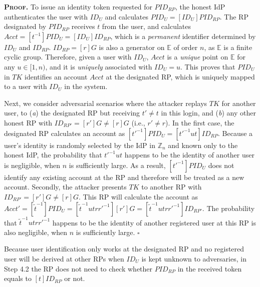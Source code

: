 \noindent\textbf{\textsc{Proof.}}
To issue an identity token requested for $PID_{RP}$, the honest IdP authenticates the user with $ID_U$ and calculates $PID_U = [ID_U]PID_{RP}$.
The RP designated by $PID_{RP}$ receives $t$ from the user,
    and calculates $Acct = [t^{-1}]PID_{U} = [ID_U]ID_{RP}$, which is a \emph{permanent} identifier determined by $ID_U$ and $ID_{RP}$.
$ID_{RP} = [r]G$ is also a generator on $\mathbb{E}$ of order $n$, as $\mathbb{E}$ is a finite cyclic group. Therefore, given a user with $ID_U$, $Acct$ is a \emph{unique} point on $\mathbb{E}$ for any $u \in [1, n)$, and it is \emph{uniquely} associated with $ID_U=u$. 
This proves that $PID_U$ in $TK$ identifies an account $Acct$ at the designated RP, which is uniquely mapped to a user with $ID_U$ in the system.

Next, we consider adversarial scenarios where the attacker replays $TK$ for another user,
 to (\emph{a}) the designated RP but receiving $t'\neq t$ in this login, and (\emph{b}) any other honest RP with $ID_{RP'} = [r']G \neq [r]G$ (i.e., $r' \neq r$). In the first case, the designated RP calculates an account as $[t'^{-1}]PID_U = [t'^{-1}ut]ID_{RP}$.
Because a user's identity is randomly selected by the IdP in $\mathbb{Z}_n$ and known only to the honest IdP, the probability that $t'^{-1}ut$ happens to be the identity of another user is negligible, when $n$ is sufficiently large. As a result, $[t'^{-1}]PID_U$ does not identify any existing account at the RP and therefore will be treated as a new account. 
Secondly, the attacker presents $TK$ to another RP with $ID_{RP'} = [r']G \neq [r]G$.
This RP will calculate the account as $Acct' = [\tilde{t}^{-1}]PID_{U} = [\tilde{t}^{-1}utrr'^{-1}][r']G = [\tilde{t}^{-1}utrr'^{-1}]ID_{RP'}$. The probability that $\tilde{t}^{-1}utrr'^{-1}$ happens to be the identity of another registered user at this RP is also negligible, when $n$ is sufficiently large. 
\hfill $\square$


Because user identification only works at the designated RP and
    no registered user will be derived at other RPs when $ID_U$ is kept unknown to adversaries,
 in Step 4.2 the RP does not need to check whether $PID_{RP}$ in the received token equals to $[t]ID_{RP}$ or not.



